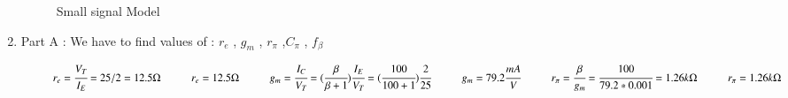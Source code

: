 \begin{enumerate}[label=\thesubsection.\arabic*.,ref=\thesubsection.\theenumi]
\begin{figure}[!ht]
	\begin{center}
				\resizebox{\columnwidth}{!}{}
	\end{center}
\caption{Small signal Model }
\label{fig:circuit_1}
\end{figure}

\vspace{0.2cm}

\item
Part A : We have to find values of :
 $r_{e}$ , $g_{m}$ , $r_{\pi}$ ,$C_{\pi}$ , $f_{\beta}$
 
 \vspace{0.5cm}

\solution

\begin{align}

 \hspace{1cm}  r_{e}  = \cfrac{V_{T}}{I_{E}} \vspace{0.2cm}
         = 25/2  \vspace{0.2cm}
         = 12.5\ohm \vspace{0.2cm}
        
 \hspace{1cm}        r_{e}=12.5 \ohm
        
        \vspace{1cm}

    
\hspace{1cm}  g_{m} = \cfrac{I_{C}}{V_{T}} 
        = (\cfrac{\beta}{\beta+1})\cfrac{I_{E}}{V_{T}}
        \vspace{0.2cm}
        = (\cfrac{100}{100+1})\cfrac{2}{25}
        
        \vspace{0.5cm}
        
    \hspace{1cm}    g_{m}=79.2 \cfrac{mA}{V}
        \vspace{1cm}

\hspace{1cm}      r_{\pi} = \cfrac{\beta}{g_{m}}
              = \cfrac{100}{79.2 * 0.001}
              = 1.26 k\ohm
              
               \vspace{0.5cm}
        
\hspace{1cm}        r_{\pi} = 1.26 k\ohm
        
        \vspace{1cm}


\end{align}
\end{enumerate}
